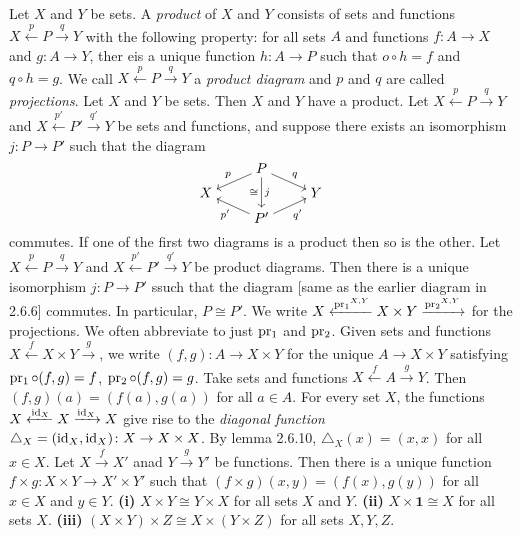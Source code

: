  Let $X$ and $Y$ be sets. A \textit{product} of $X$ and $Y$ consists of sets and functions $X \xleftarrow{p} P \xrightarrow{q} Y$ with the following property: for all sets $A$ and functions $f \colon A \to X$ and $g \colon A \to Y$, ther eis a unique function $h \colon A \to P$ such that $o \circ h = f$ and $q \circ h = g$. We call $X \xleftarrow{p} P \xrightarrow{q} Y$ a \textit{product diagram} and $p$ and $q$ are called \textit{projections}.
 Let $X$ and $Y$ be sets. Then $X$ and $Y$ have a product.
 Let $X \xleftarrow{p} P \xrightarrow{q} Y$ and $X \xleftarrow{p'} P' \xrightarrow{q'} Y$ be sets and functions, and suppose there exists an isomorphism $j \colon P \to P'$ such that the diagram
\[\begin{tikzcd}[cramped, row sep=tiny]
	& P \\
	X && Y \\
	& {P'}
	\arrow["p"', from=1-2, to=2-1]
	\arrow["q", from=1-2, to=2-3]
	\arrow["j", "\cong"', from=1-2, to=3-2]
	\arrow["{p'}", from=3-2, to=2-1]
	\arrow["{q'}"', from=3-2, to=2-3]
\end{tikzcd}\]
commutes. If one of the first two diagrams is a product then so is the other.
 Let $X \xleftarrow{p} P \xrightarrow{q} Y$ and $X \xleftarrow{p'} P' \xrightarrow{q'} Y$ be product diagrams. Then there is a unique isomorphism $j \colon P \to P'$ ssuch that the diagram [same as the earlier diagram in 2.6.6] commutes. In particular, $P \cong P'$.
 We write $X \xleftarrow{\operatorname{pr_1}^{X, Y}} X \times Y \xrightarrow{\operatorname{pr_2}^{X, Y}}$ for the projections. We often abbreviate to just $\operatorname{pr_1}$ and $\operatorname{pr_2}$.
 Given sets and functions $X \xleftarrow{f} X \times Y \xrightarrow{g}$, we write $(f, g) \colon A \to X \times Y$ for the unique $A \to X \times Y$ satisfying $\operatorname{pr_1} \circ (f, g) = f$, $\operatorname{pr_2} \circ (f, g) = g$.
 Take sets and functions $X \xleftarrow{f} A \xrightarrow{g} Y$. Then $(f, g)(a) = (f(a), g(a))$ for all $a \in A$.
 For every set $X$, the functions $X \xleftarrow{\operatorname{id}_X} X \xrightarrow{\operatorname{id}_X} X$ give rise to the \textit{diagonal function} $\triangle_X = (\operatorname{id}_X, \operatorname{id}_X) \colon X \to X \times X$. By lemma 2.6.10, $\triangle_X(x) = (x, x)$ for all $x \in X$.
 Let $X \xrightarrow{f} X'$ anad $Y \xrightarrow{g} Y'$ be functions. Then there is a unique function $f \times g \colon X \times Y \to X' \times Y'$ such that $(f \times g)(x, y) = (f(x), g(y))$ for all $x \in X$ and $y \in Y$.
 \textbf{(i)} $X \times Y \cong Y \times X$ for all sets $X$ and $Y$. \textbf{(ii)} $X \times \textbf{1} \cong X$ for all sets $X$. \textbf{(iii)} $(X \times Y) \times Z \cong X \times (Y \times Z)$ for all sets $X, Y, Z$.
